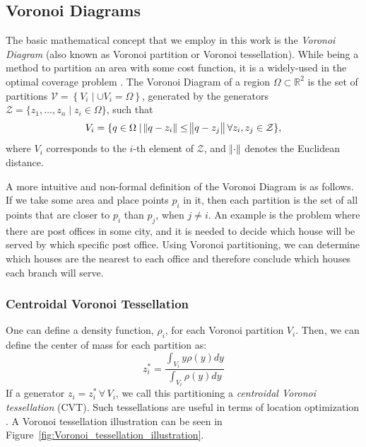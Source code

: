 \documentclass{iacas}
\newcommand{\rsqr}{\mathbb{R}^2}
\begin{document}
\subsection{Voronoi Diagrams}
The basic mathematical concept that we employ in this work is the \emph{Voronoi Diagram} (also known as Voronoi partition or Voronoi tessellation). While being a method to partition an area with some cost function, it is a widely-used in the optimal coverage problem \cite{Cortes2004,Hussein2007, Du1999}. The Voronoi Diagram of a region $\Omega \subset \rsqr$ is the set of partitions $\mathcal{V} = \left\{V_{i} \mid \cup V_{i} = \Omega\right\}$, generated by the generators $\mathcal{Z} = \{z_1,\ldots,z_n\mid z_{i} \in \Omega\}$, such that
\begin{equation} \label{Voronoi Definition}
V_{i} = \{q\in\Omega \mid \norm{q - z_i} \leq \norm{q - z_j} \forall z_i,z_j\in\mathcal{Z}\},
\end{equation}
where $V_{i}$ corresponds to the $i$-th element of $\mathcal{Z}$, and $\norm{\cdot}$ denotes the Euclidean distance.

A more intuitive and non-formal definition of the Voronoi Diagram is as follows. If we take some area and place points $p_i$ in it, then each partition is the set of all points that are closer to $p_i$ than $p_j$, when $j \neq i$. An example is the problem where there are post offices in some city, and it is needed to decide which house will be served by which specific post office. Using Voronoi partitioning, we can determine which houses are the nearest to each office and therefore conclude which houses each branch will serve.

\subsubsection*{Centroidal Voronoi Tessellation}
One can define a density function, $\rho_i$, for each Voronoi partition $V_{i}$. Then, we can define the center of mass for each partition as:
\begin{equation}
z_{i}^{*} = \frac{\int_{V_{i}}y\rho(y)dy}{\int_{V_{i}}\rho(y)dy}
\end{equation}
If a generator $z_{i} = z_{i}^{*} \, \forall \,V_{i}$, we call this partitioning a \emph{centroidal Voronoi tessellation} (CVT). Such tessellations are useful in terms of location optimization \cite{Cortes2004,Du1999,Atinc2013}.
A Voronoi tessellation illustration can be seen in Figure~\ref{fig:Voronoi_tessellation_illustration}. 
\end{document}

